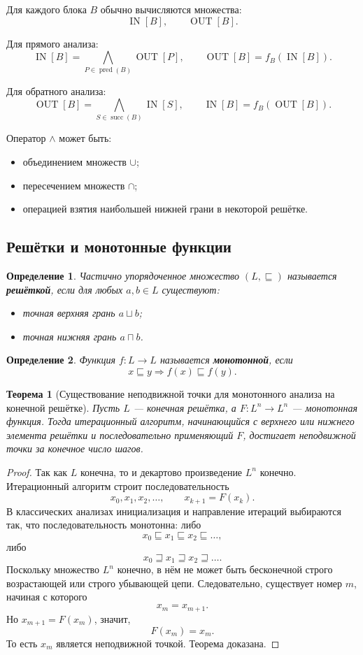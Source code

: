 \documentclass[12pt,a4paper]{article}
\newtheorem{definition}{Определение}
\newtheorem{theorem}{Теорема}
\DeclareMathOperator{\IN}{IN}
\DeclareMathOperator{\OUT}{OUT}
\DeclareMathOperator{\pred}{pred}
\DeclareMathOperator{\succs}{succ}
\begin{document}
Для каждого блока $B$ обычно вычисляются множества:
\[
\IN[B], \qquad \OUT[B].
\]

Для прямого анализа:
\[
\IN[B] = \bigwedge_{P \in \pred(B)} \OUT[P],
\qquad
\OUT[B] = f_B(\IN[B]).
\]

Для обратного анализа:
\[
\OUT[B] = \bigwedge_{S \in \succs(B)} \IN[S],
\qquad
\IN[B] = f_B(\OUT[B]).
\]

Оператор $\wedge$ может быть:
\begin{itemize}
    \item объединением множеств $\cup$;
    \item пересечением множеств $\cap$;
    \item операцией взятия наибольшей нижней грани в некоторой решётке.
\end{itemize}

\subsection{Решётки и монотонные функции}

\begin{definition}
Частично упорядоченное множество $(L,\sqsubseteq)$ называется \textbf{решёткой}, если для любых $a,b\in L$ существуют:
\begin{itemize}
    \item точная верхняя грань $a \sqcup b$;
    \item точная нижняя грань $a \sqcap b$.
\end{itemize}
\end{definition}

\begin{definition}
Функция $f:L\to L$ называется \textbf{монотонной}, если
\[
x \sqsubseteq y \Rightarrow f(x) \sqsubseteq f(y).
\]
\end{definition}

\begin{theorem}[Существование неподвижной точки для монотонного анализа на конечной решётке]
Пусть $L$ --- конечная решётка, а $F:L^n\to L^n$ --- монотонная функция. Тогда итерационный алгоритм, начинающийся с верхнего или нижнего элемента решётки и последовательно применяющий $F$, достигает неподвижной точки за конечное число шагов.
\end{theorem}

\begin{proof}
Так как $L$ конечна, то и декартово произведение $L^n$ конечно. Итерационный алгоритм строит последовательность
\[
x_0, x_1, x_2, \dots,
\qquad
x_{k+1}=F(x_k).
\]
В классических анализах инициализация и направление итераций выбираются так, что последовательность монотонна: либо
\[
x_0 \sqsubseteq x_1 \sqsubseteq x_2 \sqsubseteq \dots,
\]
либо
\[
x_0 \sqsupseteq x_1 \sqsupseteq x_2 \sqsupseteq \dots.
\]
Поскольку множество $L^n$ конечно, в нём не может быть бесконечной строго возрастающей или строго убывающей цепи. Следовательно, существует номер $m$, начиная с которого
\[
x_m=x_{m+1}.
\]
Но $x_{m+1}=F(x_m)$, значит,
\[
F(x_m)=x_m.
\]
То есть $x_m$ является неподвижной точкой. Теорема доказана.
\end{proof}
\end{document}
